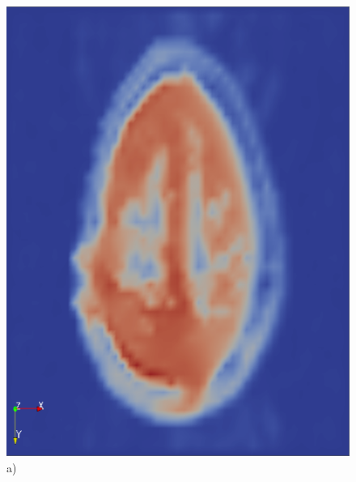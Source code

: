 \documentclass{scrartcl}
\begin{document}
\begin{figure}[!t]
\centering
  \begin{minipage}{0.3\textwidth}
  \centering
  \includegraphics[width=\textwidth]{img_new/brain_surf.PNG}
     \label{a)}
      a)
  \end{minipage}
  \begin{minipage}{0.3\textwidth}
    \centering

\end{minipage}
\end{figure}
\end{document}
